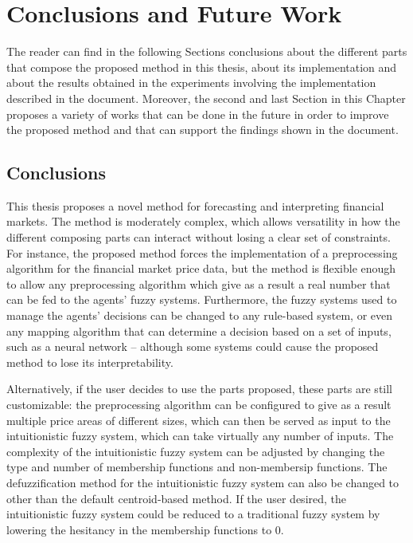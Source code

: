 \chapter{Conclusions and Future Work}
\label{chapter:conclusions-and-future-work}

The reader can find in the following Sections conclusions about the different
parts that compose the proposed method in this thesis, about its implementation
and about the results obtained in the experiments involving the implementation
described in the document. Moreover, the second and last Section in this Chapter
proposes a variety of works that can be done in the future in order to improve
the proposed method and that can support the findings shown in the document.

\section{Conclusions}
\label{section:conclusions}

This thesis proposes a novel method for forecasting and interpreting financial
markets. The method is moderately complex, which allows versatility in how the
different composing parts can interact without losing a clear set of
constraints. For instance, the proposed method forces the implementation of a
preprocessing algorithm for the financial market price data, but the method is
flexible enough to allow any preprocessing algorithm which give as a result a
real number that can be fed to the agents' fuzzy systems. Furthermore, the fuzzy
systems used to manage the agents' decisions can be changed to any rule-based
system, or even any mapping algorithm that can determine a decision based on a
set of inputs, such as a neural network -- although some systems could cause the
proposed method to lose its interpretability.

Alternatively, if the user decides to use the parts proposed, these parts are
still customizable: the preprocessing algorithm can be configured to give as a
result multiple price areas of different sizes, which can then be served as
input to the intuitionistic fuzzy system, which can take virtually any number of
inputs. The complexity of the intuitionistic fuzzy system can be adjusted by
changing the type and number of membership functions and non-membersip
functions. The defuzzification method for the intuitionistic fuzzy system can
also be changed to other than the default centroid-based method. If the user
desired, the intuitionistic fuzzy system could be reduced to a traditional fuzzy
system by lowering the hesitancy in the membership functions to 0.

